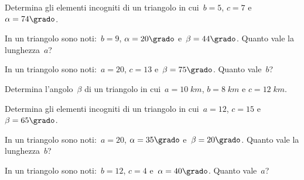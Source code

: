 \begin{multicols}{2}
 \begin{esercizio}
\label{ese:G.68}
Determina gli elementi incogniti di un triangolo in cui~$b=5$, $c=7$ e~$\alpha=74\grado$.
\end{esercizio}

\begin{esercizio}
\label{ese:G.69}
In un triangolo sono noti:~$b=9$, $\alpha=20\grado$ e~$\beta=44\grado$. Quanto vale la lunghezza~$a$?
\end{esercizio}

\begin{esercizio}
\label{ese:G.70}
In un triangolo sono noti:~$a=20$, $c=13$ e~$\beta=75\grado$. Quanto vale~$b$?
\end{esercizio}

\begin{esercizio}
\label{ese:G.71}
Determina l'angolo~$\beta$ di un triangolo in cui~$a=10\;\unit{km}$, $b=8\;\unit{km}$ e $c=12\;\unit{km}$.
\end{esercizio}

\begin{esercizio}
\label{ese:G.72}
Determina gli elementi incogniti di un triangolo in cui~$a=12$, $c=15$ e~$\beta=65\grado$.
\end{esercizio}

\begin{esercizio}
\label{ese:G.73}
In un triangolo sono noti:~$a= 20$, $\alpha=35\grado$ e~$\beta=20\grado$. Quanto vale la lunghezza~$b$?
\end{esercizio}

\begin{esercizio}
\label{ese:G.74}
In un triangolo sono noti:~$b= 12$, $c=4$ e~$\alpha=40\grado$. Quanto vale~$a$?
\end{esercizio}
\end{multicols}

